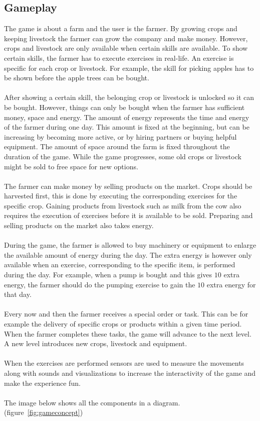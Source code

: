 \documentclass[a4paper,11pt,notitlepage]{report}
\begin{document}
\subsection{Gameplay}
The game is about a farm and the user is the farmer. By growing crops and keeping livestock the farmer can grow the company and make money. However, crops and livestock are only available when certain skills are available. To show certain skills, the farmer has to execute exercises in real-life. An exercise is specific for each crop or livestock. For example, the skill for picking apples has to be shown before the apple trees can be bought. 
\\\\
After showing a certain skill, the belonging crop or livestock is unlocked so it can be bought. However, things can only be bought when the farmer has sufficient money, space and energy. The amount of energy represents the time and energy of the farmer during one day. This amount is fixed at the beginning, but can be increasing by becoming more active, or by hiring partners or buying helpful equipment. The amount of space around the farm is fixed throughout the duration of the game. While the game progresses, some old crops or livestock might be sold to free space for new options.
\\\\
The farmer can make money by selling products on the market. Crops should be harvested first, this is done by executing the corresponding exercises for the specific crop. Gaining products from livestock such as milk from the cow also requires the execution of exercises before it is available to be sold. Preparing and selling products on the market also takes energy.
\\\\
During the game, the farmer is allowed to buy machinery or equipment to enlarge the available amount of energy during the day. The extra energy is however only available when an exercise, corresponding to the specific item, is performed during the day. For example, when a pump is bought and this gives $10$ extra energy, the farmer should do the pumping exercise to gain the $10$ extra energy for that day. 
\\\\
Every now and then the farmer receives a special order or task. This can be for example the delivery of specific crops or products within a given time period. When the farmer completes these tasks, the game will advance to the next level. A new level introduces new crops, livestock and equipment.
\\\\
When the exercises are performed sensors are used to measure the movements along with sounds and visualizations to increase the interactivity of the game and make the experience fun.
\\\\
The image below shows all the components in a diagram. (figure~\ref{fig:gameconcept})
\end{document}
